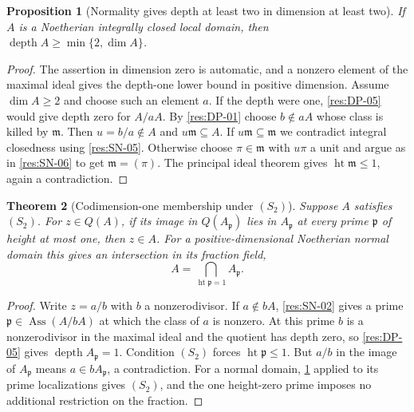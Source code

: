 \documentclass[11pt,oneside,openany]{book}
\newtheorem{theorem}{Theorem}[chapter]
\newtheorem{proposition}[theorem]{Proposition}
\theoremstyle{definition}
\theoremstyle{remark}
\begin{document}
\begin{proposition}[Normality gives depth at least two in dimension at least two]\label{res:SN-07}
If $A$ is a Noetherian integrally closed local domain, then
$\operatorname{depth}A\ge\min\{2,\dim A\}$.
\end{proposition}
\begin{proof}
The assertion in dimension zero is automatic, and a nonzero
element of the maximal ideal gives the depth-one lower bound
in positive dimension. Assume $\dim A\ge2$ and choose such an
element $a$. If the depth were one, \ref{res:DP-05} would
give depth zero for $A/aA$. By \ref{res:DP-01} choose
$b\notin aA$ whose class is killed by $\mathfrak m$.
Then $u=b/a\notin A$ and $u\mathfrak m\subseteq A$.
If $u\mathfrak m\subseteq\mathfrak m$ we contradict integral
closedness using \ref{res:SN-05}. Otherwise choose
$\pi\in\mathfrak m$ with $u\pi$ a unit and argue as in
\ref{res:SN-06} to get $\mathfrak m=(\pi)$. The principal
ideal theorem \cite[Chapter 6]{p103} gives
$\operatorname{ht}\mathfrak m\le1$, again a contradiction.
\end{proof}

\begin{theorem}[Codimension-one membership under $(S_2)$]\label{res:SN-08}
Suppose $A$ satisfies $(S_2)$. For $z\in Q(A)$, if its image
in $Q(A_{\mathfrak p})$ lies in $A_{\mathfrak p}$ at every
prime $\mathfrak p$ of height at most one, then $z\in A$.
For a positive-dimensional Noetherian normal domain this
gives an intersection in its fraction field,
\[
 A=\bigcap_{\operatorname{ht}\mathfrak p=1} A_{\mathfrak p}.
\]
\end{theorem}
\begin{proof}
Write $z=a/b$ with $b$ a nonzerodivisor. If $a\notin bA$,
\ref{res:SN-02} gives a prime
$\mathfrak p\in\operatorname{Ass}(A/bA)$ at which the class
of $a$ is nonzero. At this prime $b$ is a nonzerodivisor
in the maximal ideal and the quotient has depth zero, so
\ref{res:DP-05} gives $\operatorname{depth}A_{\mathfrak p}=1$.
Condition $(S_2)$ forces $\operatorname{ht}\mathfrak p\le1$.
But $a/b$ in the image of $A_{\mathfrak p}$ means
$a\in bA_{\mathfrak p}$, a contradiction. For a normal
domain, \ref{res:SN-07} applied to its prime localizations
gives $(S_2)$, and the one height-zero prime imposes no
additional restriction on the fraction.
\end{proof}
\end{document}
